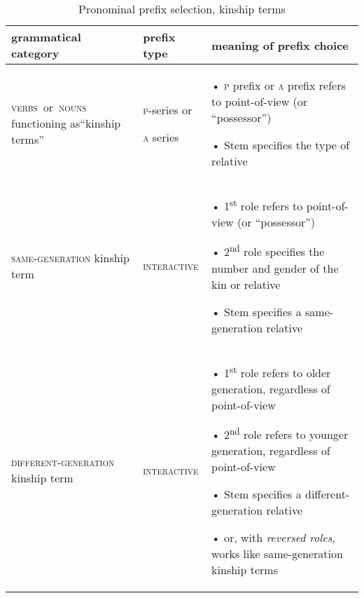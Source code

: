\begin{table}
\caption{Pronominal prefix selection, kinship terms}
\label{figtab:1:pronselkinship}
{
\begin{tabularx}{\textwidth}{p{2.5cm}lQ}

\lsptoprule
grammatical category & prefix type & meaning of prefix choice\\
\midrule
\mbox{\textsc{verbs} or \textsc{nouns}} functioning as\newline “kinship terms” & \textsc{p}-series or

\textsc{a}{} series & • \textsc{p} prefix or \textsc{a} prefix refers to point-of-view (or “possessor”)

• Stem specifies the type of relative\\
\midrule
\textsc{same-generation} kinship term & \textsc{interactive} & • 1\textsuperscript{st} role refers to point-of-view (or “possessor”)


• 2\textsuperscript{nd} role specifies the number and gender of the kin or relative

• Stem specifies a same-generation relative\\

\midrule
\textsc{different-generation} kinship term & \textsc{interactive} & • 1\textsuperscript{st} role refers to older generation, regardless of point-of-view

• 2\textsuperscript{nd} role refers to younger generation, regardless of point-of-view

• Stem specifies a different-generation relative

• or, with \emph{reversed roles}, works like same-generation kinship terms\\
\midrule
\end{tabularx}
}
\end{table}

